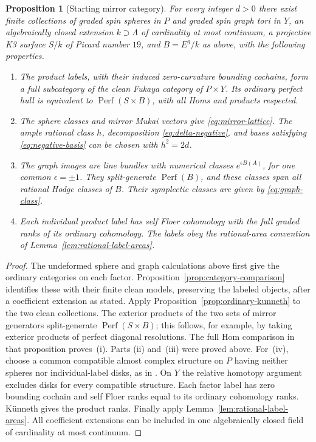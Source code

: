 \documentclass[11pt]{article}
\numberwithin{equation}{section}
\newtheorem{proposition}[theorem]{Proposition}
\theoremstyle{definition}
\theoremstyle{remark}
\newcommand{\Perf}{\operatorname{Perf}}
\begin{document}
\begin{proposition}[Starting mirror category]\label{prop:mirror-input}
For every integer $d>0$ there exist finite collections of graded spin
spheres in $P$ and graded spin graph tori in $Y$, an algebraically closed
extension $k\supset\Lambda$ of cardinality at most continuum, a projective
K3 surface $S/k$ of Picard number $19$, and $B=E^g/k$ as above, with
the following properties.
\begin{enumerate}[label=\textup{(\roman*)}]
\item The product labels, with their induced zero-curvature bounding
cochains, form a full subcategory of the clean Fukaya category of
$P\times Y$.  Its ordinary perfect hull is equivalent to
$\Perf(S\times B)$, with all Homs and products respected.
\item The sphere classes and mirror Mukai vectors give
\eqref{eq:mirror-lattice}.  The ample rational class $h$, decomposition
\eqref{eq:delta-negative}, and bases satisfying
\eqref{eq:negative-basis} can be chosen with $h^2=2d$.
\item The graph images are line bundles with numerical classes
$e^{\epsilon B(A)}$, for one common $\epsilon=\pm1$.  They
split-generate $\Perf(B)$, and these classes span all rational
Hodge classes of $B$.  Their symplectic classes are given by
\eqref{eq:graph-class}.
\item Each individual product label has self Floer cohomology with
the full graded ranks of its ordinary cohomology.  The labels obey
the rational-area convention of Lemma~\ref{lem:rational-label-areas}.
\end{enumerate}
\end{proposition}
\begin{proof}
The undeformed sphere and graph calculations above first give the
ordinary categories on each factor.  Proposition~\ref{prop:category-comparison}
identifies these with their finite clean models, preserving the labeled
objects, after a coefficient extension as stated.  Apply
Proposition~\ref{prop:ordinary-kunneth} to the two clean collections.
The exterior products of the two sets of mirror generators
split-generate $\Perf(S\times B)$; this follows, for example, by
taking exterior products of perfect diagonal resolutions.  The full
Hom comparison in that proposition proves~\textup{(i)}.  Parts
\textup{(ii)} and~\textup{(iii)} were proved above.  For~\textup{(iv)},
choose a common compatible almost complex structure on $P$ having
neither spheres nor individual-label disks, as in
\cite[Lemma~8.4]{HMS:SeidelQuartic}.  On $Y$ the relative homotopy argument excludes disks
for every compatible structure.  Each factor label has zero
bounding cochain and self Floer ranks equal to its ordinary
cohomology ranks.  K\"unneth gives the product ranks.  Finally apply
Lemma~\ref{lem:rational-label-areas}.  All coefficient extensions can
be included in one algebraically closed field of cardinality at
most continuum.
\end{proof}
\end{document}
